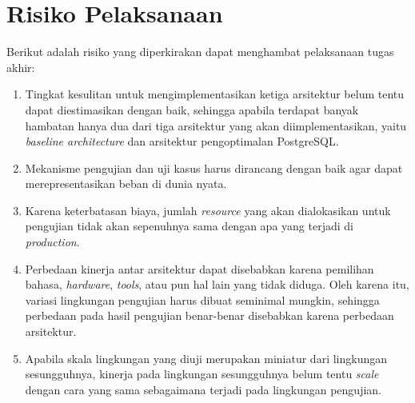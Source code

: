\section{Risiko Pelaksanaan}

Berikut adalah risiko yang diperkirakan dapat menghambat pelaksanaan tugas akhir:

\begin{enumerate}
    \item Tingkat kesulitan untuk mengimplementasikan ketiga arsitektur belum tentu dapat diestimasikan dengan baik, sehingga apabila terdapat banyak hambatan hanya dua dari tiga arsitektur yang akan diimplementasikan, yaitu \textit{baseline architecture} dan arsitektur pengoptimalan PostgreSQL.
    \item Mekanisme pengujian dan uji kasus harus dirancang dengan baik agar dapat merepresentasikan beban di dunia nyata.
    \item Karena keterbatasan biaya, jumlah \textit{resource} yang akan dialokasikan untuk pengujian tidak akan sepenuhnya sama dengan apa yang terjadi di \textit{production}.
    \item Perbedaan kinerja antar arsitektur dapat disebabkan karena pemilihan bahasa, \textit{hardware}, \textit{tools}, atau pun hal lain yang tidak diduga. Oleh karena itu, variasi lingkungan pengujian harus dibuat seminimal mungkin, sehingga perbedaan pada hasil pengujian benar-benar disebabkan karena perbedaan arsitektur.
    \item Apabila skala lingkungan yang diuji merupakan miniatur dari lingkungan sesungguhnya, kinerja pada lingkungan sesungguhnya belum tentu \textit{scale} dengan cara yang sama sebagaimana terjadi pada lingkungan pengujian.
\end{enumerate}